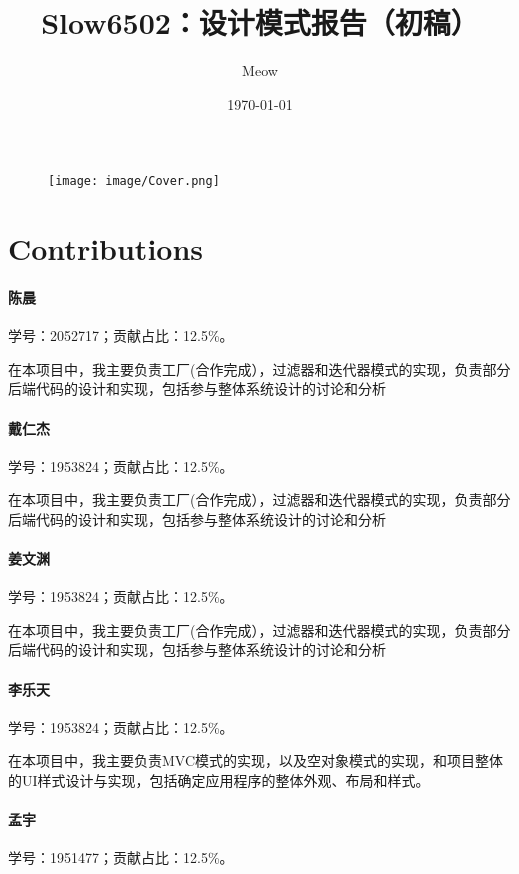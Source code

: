 \documentclass[cn,black,12pt,normal]{elegantnote}
\title{Slow6502：设计模式报告（初稿）}
\author{Meow}
\institute{软件学院}
\date{\today}
\begin{document}
\maketitle

\begin{figure}[H]
    \centering
    \texttt{[image: image/Cover.png]}
\end{figure}

\newpage
\section*{Contributions}

\paragraph*{陈晨} 学号：2052717；贡献占比：12.5\%。

在本项目中，我主要负责工厂(合作完成），过滤器和迭代器模式的实现，负责部分后端代码的设计和实现，包括参与整体系统设计的讨论和分析

\paragraph*{戴仁杰} 学号：1953824；贡献占比：12.5\%。

在本项目中，我主要负责工厂(合作完成），过滤器和迭代器模式的实现，负责部分后端代码的设计和实现，包括参与整体系统设计的讨论和分析

\paragraph*{姜文渊} 学号：1953824；贡献占比：12.5\%。

在本项目中，我主要负责工厂(合作完成），过滤器和迭代器模式的实现，负责部分后端代码的设计和实现，包括参与整体系统设计的讨论和分析

\paragraph*{李乐天} 学号：1953824；贡献占比：12.5\%。

在本项目中，我主要负责MVC模式的实现，以及空对象模式的实现，和项目整体的UI样式设计与实现，包括确定应用程序的整体外观、布局和样式。

\paragraph*{孟宇} 学号：1951477；贡献占比：12.5\%。
\end{document}
